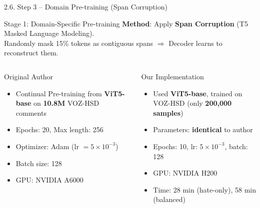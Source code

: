 \documentclass[11pt, aspectratio=169]{beamer}
\begin{document}
\begin{frame}[shrink=5]{2.6. Step 3 -- Domain Pre-training (Span Corruption)}

\begin{block}{Stage 1: Domain-Specific Pre-training}
  \textbf{Method}: Apply \textbf{Span Corruption} (T5 Masked Language Modeling).\\
  Randomly mask 15\% tokens as contiguous spans $\Rightarrow$ Decoder learns to reconstruct them.
\end{block}

\vspace{0.2cm}
\begin{columns}[T]
  \begin{block}{Original Author}
    \begin{itemize}
      \item Continual Pre-training from \textbf{ViT5-base} on \textbf{10.8M} VOZ-HSD comments
      \item Epochs: 20, Max length: 256
      \item Optimizer: Adam (lr $= 5 \times 10^{-3}$)
      \item Batch size: 128
      \item GPU: NVIDIA A6000
    \end{itemize}
  \end{block}

  \begin{block}{Our Implementation}
    \begin{itemize}
      \item Used \textbf{ViT5-base}, trained on VOZ-HSD (only \textbf{200,000 samples})
      \item Parameters: \textbf{identical} to author
      \item Epochs: 10, lr: $5 \times 10^{-3}$, batch: 128
      \item GPU: NVIDIA H200
      \item Time: 28 min (hate-only), 58 min (balanced)
    \end{itemize}
  \end{block}
\end{columns}
\end{frame}
\end{document}
